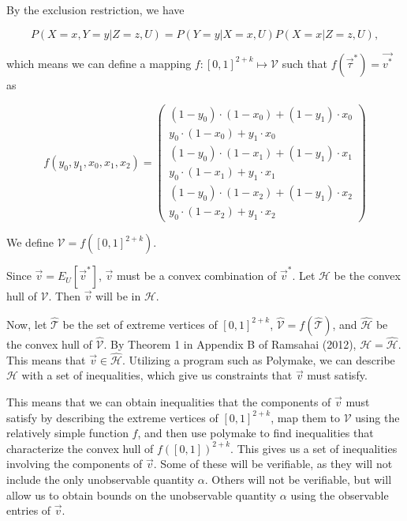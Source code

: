 \documentclass[
]{article}
\theoremstyle{plain}
\begin{document}
By the exclusion restriction, we have

\[
P(X = x, Y = y | Z = z, U) = P(Y = y | X = x, U) P(X = x | Z = z, U),
\]

which means we can define a mapping \(f:[0,1]^{2+k} \mapsto \mathcal{V}\) such that \(f(\vec{\tau}^*) = \vec{v^*}\) as

\[
f(y_0, y_1, x_0, x_1, x_2) = 
  \begin{pmatrix} 
    (1-y_0)\cdot(1-x_0) + (1 - y_1)\cdot x_0 \\
    y_0\cdot (1-x_0) + y_1\cdot x_0 \\
        (1-y_0)\cdot(1-x_1) + (1 - y_1)\cdot x_1 \\
    y_0\cdot (1-x_1) + y_1\cdot x_1 \\
            (1-y_0)\cdot(1-x_2) + (1 - y_1)\cdot x_2 \\
    y_0\cdot (1-x_2) + y_1\cdot x_2 
  \end{pmatrix} \label{eq:f}
\]

We define \(\mathcal{V} = f([0,1]^{2+k})\).

Since \(\vec{v} = E_U[\vec{v}^*]\), \(\vec{v}\) must be a convex combination of \(\vec{v}^*\). Let \(\mathcal{H}\) be the convex hull of \(\mathcal{V}\). Then \(\vec{v}\) will be in \(\mathcal{H}\).

Now, let \(\hat{\mathcal{T}}\) be the set of extreme vertices of \([0,1]^{2+k}\), \(\hat{\mathcal{V}} = f(\hat{\mathcal{T}})\), and \(\hat{\mathcal{H}}\) be the convex hull of \(\hat{\mathcal{V}}\). By Theorem 1 in Appendix B of Ramsahai (2012), \(\mathcal{H} = \mathcal{\hat{H}}\). This means that \(\vec{v} \in \mathcal{\hat{H}}\). Utilizing a program such as Polymake, we can describe \(\mathcal{H}\) with a set of inequalities, which give us constraints that \(\vec{v}\) must satisfy.

This means that we can obtain inequalities that the components of \(\vec{v}\) must satisfy by describing the extreme vertices of \([0,1]^{2+k}\), map them to \(\mathcal{V}\) using the relatively simple function \(f\), and then use polymake to find inequalities that characterize the convex hull of \(f([0,1])^{2+k}\). This gives us a set of inequalities involving the components of \(\vec{v}\). Some of these will be verifiable, as they will not include the only unobservable quantity \(\alpha\). Others will not be verifiable, but will allow us to obtain bounds on the unobservable quantity \(\alpha\) using the observable entries of \(\vec{v}\).

\end{document}
